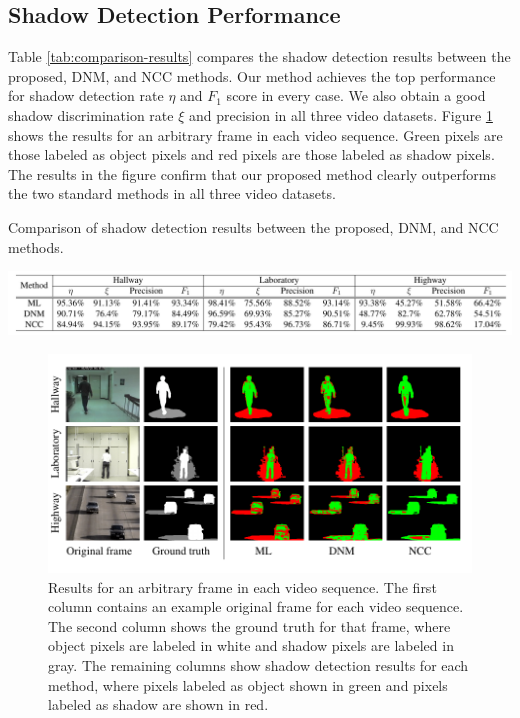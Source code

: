 \subsection{Shadow Detection Performance}

Table \ref{tab:comparison-results} compares the shadow detection
results between the proposed, DNM, and NCC methods.  Our method
achieves the top performance for shadow detection rate $\eta$ and
$F_1$ score in every case. We also obtain a good shadow discrimination
rate $\xi$ and precision in all three video
datasets. Figure \ref{fig:results-for-arbitrary-frame} shows the
results for an arbitrary frame in each video sequence. Green pixels
are those labeled as object pixels and red pixels are those labeled as
shadow pixels. The results in the figure confirm that our proposed
method clearly outperforms the two standard methods in all three video
datasets.

\begin{table}[t]
  \caption[Comparison of shadow detection results between the
    proposed, DNM, and NCC methods.]{\small Comparison of shadow
    detection results between the proposed, DNM, and NCC methods.}
  \begin{center}
    \includegraphics[width=6.1in]{figures/tab-shadow-results}
  \end{center}
  \label{tab:comparison-results}
\end{table}

\begin{figure}[t]
  \centering
  \includegraphics[width=6.2in]{figures/fig-shadow-results}
  \caption[Results for an arbitrary frame in each video
    sequence.]{\small Results for an arbitrary frame in each video
    sequence. The first column contains an example original frame for
    each video sequence. The second column shows the ground truth for
    that frame, where object pixels are labeled in white and shadow
    pixels are labeled in gray. The remaining columns show shadow
    detection results for each method, where pixels labeled as object
    shown in green and pixels labeled as shadow are shown in red.}
  \label{fig:results-for-arbitrary-frame}
\end{figure}

